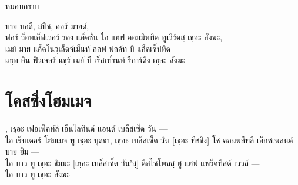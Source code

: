 \begin{instruction}
หมอบกราบ
\end{instruction}

\begin{thaitrans}
บาย บอดี, สปีช, ออร์ มายด์,\\
ฟอร์ ว็อทเอ็ฟเวอร์ รอง แอ็คชั่น ไอ แฮฟ คอมมิททิด ทูเวิร์ดสฺ เธฺอะ สังฆะ,\\
เมย์ มาย แอ็คโนวฺเล็ดจ์เม็นท์ ออฟ ฟอล์ท บี แอ็คเซ็ปทิด\\
แธฺท อิน ฟิวเจอร์ แธฺร์ เมย์ บี เร็สเท๎รนท์ รีการ์ดิง เธฺอะ สังฆะ\\
\end{thaitrans}

\chapter{โคสซิ่งโฮมเมจ}

\begin{thaitrans}
[เธฺอะ โลร์ด], เธฺอะ เฟอเฟ็คท์ลี เอ็นไลทึนด์ แอนด์ เบล็สเซ็ด วัน —\\
ไอ เร็นเดอร์ โฮมเมจ ทู เธฺอะ บุดธา, เธฺอะ เบล็สเซ็ด วัน
[เธฺอะ ทีชชิง] โซ คอมพลีทลี เอ็กซเพลนด์ บาย ฮิม —\\
	ไอ บาว ทู เธฺอะ ธัมมะ
[เธฺอะ เบล็สเซ็ด วัน’สฺ] ดิสไซโพลสฺ ฮู แฮฟ แพร็คทิสด์ เววล์ —\\
	ไอ บาว ทู เธฺอะ สังฆะ
\end{thaitrans}

